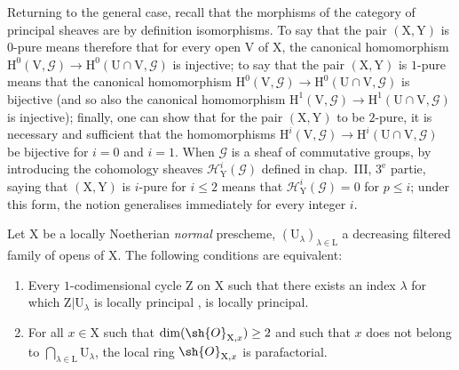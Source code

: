 \begin{remark}[21.13.13]
Returning to the general case, recall that the morphisms of the category of principal sheaves are by definition isomorphisms.
To say that the pair $(\mathrm{X},\mathrm{Y})$ is $0$-pure means therefore that for every open $\mathrm{V}$ of $\mathrm{X}$, the canonical homomorphism $\mathrm{H}^0(\mathrm{V},\mathscr{G})\to\mathrm{H}^0(\mathrm{U}\cap\mathrm{V},\mathscr{G})$ is injective; to say that the pair $(\mathrm{X},\mathrm{Y})$ is $1$-pure means that the canonical homomorphism $\mathrm{H}^0(\mathrm{V},\mathscr{G})\to\mathrm{H}^0(\mathrm{U}\cap\mathrm{V},\mathscr{G})$ is bijective (and so also the canonical homomorphism $\mathrm{H}^1(\mathrm{V},\mathscr{G})\to\mathrm{H}^1(\mathrm{U}\cap\mathrm{V},\mathscr{G})$ is injective); finally, one can show that for the pair $(\mathrm{X},\mathrm{Y})$ to be $2$-pure, it is necessary and sufficient that the homomorphisms $\mathrm{H}^i(\mathrm{V},\mathscr{G})\to\mathrm{H}^i(\mathrm{U}\cap\mathrm{V},\mathscr{G})$ be bijective for $i=0$ and $i=1$.
When $\mathscr{G}$ is a sheaf of commutative groups, by introducing the cohomology sheaves $\mathscr{H}^i_{\mathrm{Y}}(\mathscr{G})$ defined in chap.~III, $3^{\text{e}}$ partie, saying that $(\mathrm{X},\mathrm{Y})$ is $i$-pure for $i\leq 2$ means that $\mathscr{H}^i_{\mathrm{Y}}(\mathscr{G})=0$ for $p\leq i$; under this form, the notion generalises immediately for every integer $i$.
\end{remark}

\begin{proposition}[21.13.14]
\label{IV.21.13.14}
Let $\mathrm{X}$ be a locally Noetherian \emph{normal} prescheme, $(\mathrm{U}_\lambda)_{\lambda\in\mathrm{L}}$ a decreasing filtered family of opens of $\mathrm{X}$.
The following conditions are equivalent:
\begin{enumerate}[label=\emph{\alph*)}]
  \item Every $1$-codimensional cycle $\mathrm{Z}$ on $\mathrm{X}$ such that there exists an index $\lambda$ for which $\mathrm{Z}|\mathrm{U}_\lambda$ is locally principal , is locally principal.
  \item For all $x\in\mathrm{X}$ such that $\dim(\sh{O}_{\mathrm{X},x})\geq 2$ and such that $x$ does not belong to $\bigcap_{\lambda\in\mathrm{L}}\mathrm{U}_\lambda$, the local ring $\sh{O}_{\mathrm{X},x}$ is parafactorial.
\end{enumerate}
\end{proposition}

